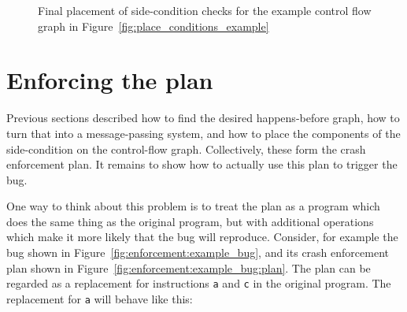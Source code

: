 \begin{figure}
  \caption{Final placement of side-condition checks for the example
    control flow graph in Figure~\ref{fig:place_conditions_example}}
  \label{fig:place_conditions_example:result}
\end{figure}

\section{Enforcing the plan}
\label{sect:enforce:interpreting}

Previous sections described how to find the desired happens-before
graph, how to turn that into a message-passing system, and how to
place the components of the side-condition on the control-flow graph.
Collectively, these form the crash enforcement plan.  It remains to
show how to actually use this plan to trigger the bug.

One way to think about this problem is to treat the plan as a program
which does the same thing as the original program, but with additional
operations which make it more likely that the bug will reproduce.
Consider, for example the bug shown in
Figure~\ref{fig:enforcement:example_bug}, and its crash enforcement
plan shown in Figure~\ref{fig:enforcement:example_bug:plan}.  The plan
can be regarded as a replacement for instructions {\tt a} and {\tt c}
in the original program.  The replacement for {\tt a} will behave like
this:

